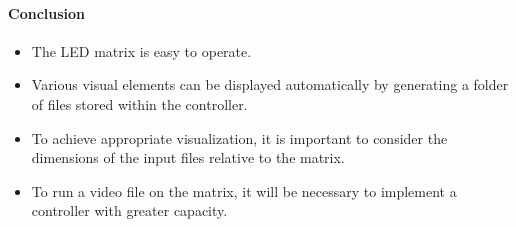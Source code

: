 \documentclass{article}
\begin{document}
\paragraph[short]{Conclusion}
\begin{itemize}
    \item The LED matrix is easy to operate.
    \item Various visual elements can be displayed automatically by generating a folder of files stored within the controller.
    \item To achieve appropriate visualization, it is important to consider the dimensions of the input files relative to the matrix.
    \item To run a video file on the matrix, it will be necessary to implement a controller with greater capacity.
\end{itemize}
\end{document}
